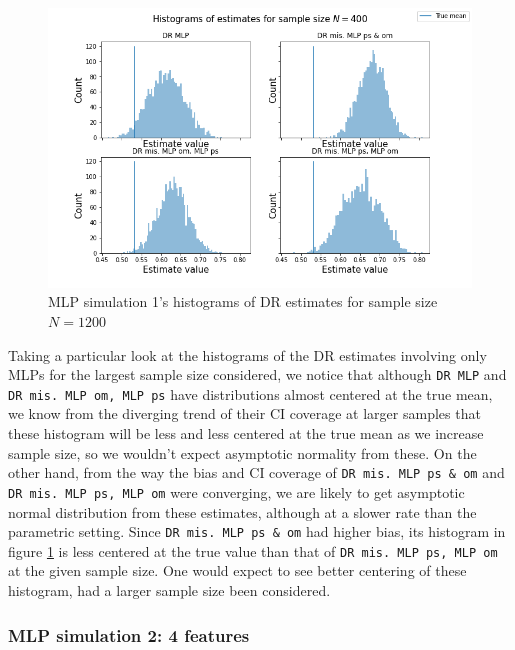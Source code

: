 \documentclass[12pt,twoside]{article}
\begin{document}
\begin{figure}[h!]
    \centering
    \includegraphics[width = 0.9\columnwidth]{figures/histMLP.png}
    \caption{MLP simulation 1's histograms of DR estimates for sample size $N = 1200$}
    \label{fighistMLP}
\end{figure}

Taking a particular look at the histograms of the DR estimates involving only MLPs for the largest sample size considered, we notice that although \texttt{DR MLP} and \texttt{DR mis. MLP om, MLP ps} have distributions almost centered at the true mean, we know from the diverging trend of their CI coverage at larger samples that these histogram will be less and less centered at the true mean as we increase sample size, so we wouldn't expect asymptotic normality from these. On the other hand, from the way the bias and CI coverage of \texttt{DR mis. MLP ps \& om} and \texttt{DR mis. MLP ps, MLP om} were converging, we are likely to get asymptotic normal distribution from these estimates, although at a slower rate than the parametric setting. Since \texttt{DR mis. MLP ps \& om} had higher bias, its histogram in figure \ref{fighistMLP} is less centered at the true value than that of \texttt{DR mis. MLP ps, MLP om} at the given sample size. One would expect to see better centering of these histogram, had a larger sample size been considered.
\clearpage
\subsubsection{MLP simulation 2: 4 features}


\clearpage
\end{document}
